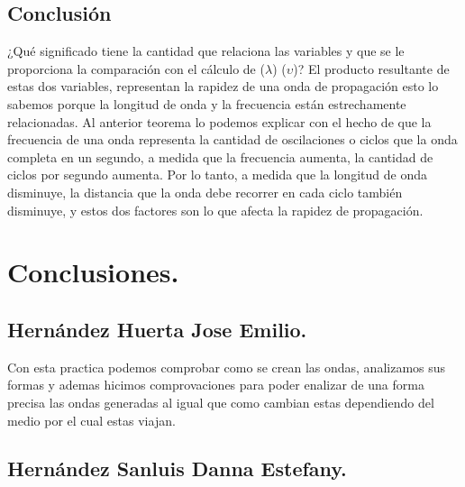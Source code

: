 \documentclass[10pt]{article}
\begin{document}
\begin{multicols}{2}
\begin{center}
\end{center}



\subsection{Conclusión}
¿Qué significado tiene la cantidad que relaciona las variables y que se le proporciona la comparación con el cálculo de ($\lambda$) ($\upsilon$)?
El producto resultante de estas dos variables, representan la rapidez de una onda de propagación esto lo sabemos porque la longitud de onda y la frecuencia están estrechamente relacionadas. Al anterior teorema lo podemos explicar con el hecho de que la frecuencia de una onda representa la cantidad de oscilaciones o ciclos que la onda completa en un segundo, a medida que la frecuencia aumenta, la cantidad de ciclos por segundo aumenta. Por lo tanto, a medida que la longitud de onda disminuye, la distancia que la onda debe recorrer en cada ciclo también disminuye, y estos dos factores son lo que afecta la rapidez de propagación.

\section{Conclusiones.}
\subsection{Hernández Huerta Jose Emilio.}
Con esta practica podemos comprobar como se crean las ondas, analizamos sus formas y ademas hicimos comprovaciones para poder enalizar de una forma precisa las ondas generadas al igual que como cambian estas dependiendo del medio por el cual estas viajan.
\subsection{Hernández Sanluis Danna Estefany.}

\end{multicols}
\end{document}

